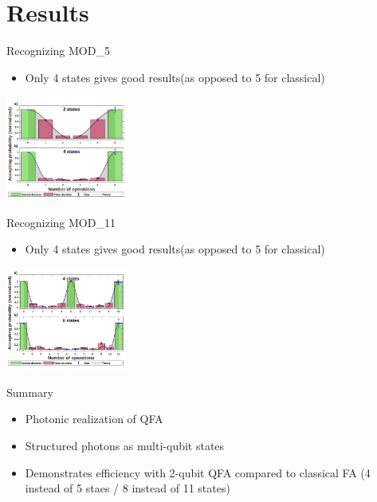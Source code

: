 \documentclass[aspectratio=169,9pt]{beamer}
\begin{document}
\section{Results}
\begin{frame}[t]{Recognizing MOD\_5}
  \begin{itemize}
    \item Only 4 states gives good results(as opposed to 5 for classical)
  \end{itemize}
  \includegraphics[width=0.3\textwidth]{2states_4states.png}
\end{frame}


\begin{frame}[t]{Recognizing MOD\_11}
  \begin{itemize}
    \item Only 4 states gives good results(as opposed to 5 for classical)
  \end{itemize}
  \includegraphics[width=0.3\textwidth]{4states_8states.png}
\end{frame}


\begin{frame}[t]{Summary}
  \begin{itemize}
    \item Photonic realization of QFA
    \item Structured photons as multi-qubit states
    \item Demonstrates efficiency with 2-qubit QFA compared to classical FA (4 instead of 5 staes / 8 instead of 11 states)
  \end{itemize}
\end{frame}


% 
\end{document}
